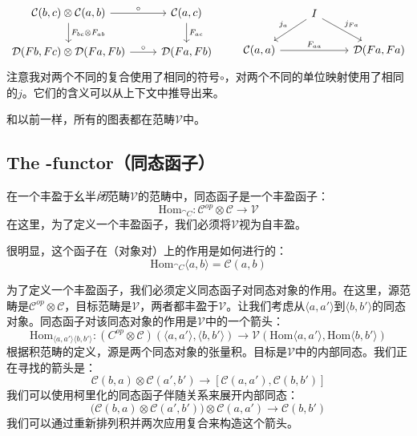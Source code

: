 \documentclass[DaoFP]{subfiles}
\begin{document}
 \[
  \begin{tikzcd}
   \mathcal C(b, c) \otimes \mathcal C(a, b)
   \arrow[r, "\circ"]
   \arrow[d, "F_{b c} \otimes F_{a b}"]
   & \mathcal C(a, c)
   \arrow[d, "F_{a c}"]
   \\
   \mathcal D(F b, F c) \otimes \mathcal D (F a, F b)
   \arrow[r, "\circ"]
   & \mathcal D(F a, F b)
  \end{tikzcd}
  \qquad
  \begin{tikzcd}
   & I
   \arrow[dl, "j_a"']
   \arrow[dr, "j_{F a}"]
   \\
   \mathcal C(a, a)
   \arrow[rr, "F_{a a}"]
   && \mathcal D( F a, F a)
  \end{tikzcd}
 \]
 注意我对两个不同的复合使用了相同的符号$\circ$，对两个不同的单位映射使用了相同的$j$。它们的含义可以从上下文中推导出来。

 和以前一样，所有的图表都在范畴$\mathcal V$中。

 \subsection{The -functor（同态函子）}

 在一个丰盈于幺半\emph{闭}范畴$\mathcal V$的范畴中，同态函子是一个丰盈函子：
 \[ \text{Hom}_{\cat C} \colon \mathcal C^{op} \otimes \mathcal C \to \mathcal V \]
 在这里，为了定义一个丰盈函子，我们必须将$\mathcal V$视为自丰盈。

 很明显，这个函子在（对象对）上的作用是如何进行的：
 \[ \text{Hom}_{\cat C} \langle a, b \rangle = \mathcal C (a, b) \]


 为了定义一个丰盈函子，我们必须定义同态函子对同态对象的作用。在这里，源范畴是$\mathcal C^{op} \otimes \mathcal C$，目标范畴是$\mathcal V$，两者都丰盈于$\mathcal V$。让我们考虑从$\langle a, a' \rangle$到$\langle b, b' \rangle$的同态对象。同态函子对该同态对象的作用是$\mathcal V$中的一个箭头：
 \[ \text{Hom}_{\langle a, a' \rangle \langle b, b' \rangle} \colon (C^{op} \otimes \mathcal C)(\langle a, a' \rangle, \langle b, b' \rangle) \to \mathcal V (\text{Hom}\langle a, a' \rangle, \text{Hom}\langle b, b' \rangle)\]
 根据积范畴的定义，源是两个同态对象的张量积。目标是$\mathcal V$中的内部同态。我们正在寻找的箭头是：
 \[ \mathcal C(b, a) \otimes \mathcal C(a', b') \to [\mathcal C(a, a'), \mathcal C(b, b')] \]
 我们可以使用柯里化的同态函子伴随关系来展开内部同态：
 \[ \Big( \mathcal C(b, a) \otimes \mathcal C(a', b') \Big) \otimes \mathcal C(a, a') \to \mathcal C(b, b') \]
 我们可以通过重新排列积并两次应用复合来构造这个箭头。
\end{document}
